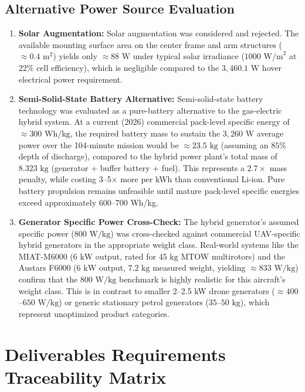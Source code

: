 \documentclass[11pt,a4paper]{article}
\begin{document}
\subsection{Alternative Power Source Evaluation}
\begin{enumerate}
    \item \textbf{Solar Augmentation:} Solar augmentation was considered and rejected. The available mounting surface area on the center frame and arm structures ($\approx 0.4\text{ m}^2$) yields only $\approx 88\text{ W}$ under typical solar irradiance ($1000\text{ W/m}^2$ at $22\%$ cell efficiency), which is negligible compared to the $3,460.1\text{ W}$ hover electrical power requirement.
    \item \textbf{Semi-Solid-State Battery Alternative:} Semi-solid-state battery technology was evaluated as a pure-battery alternative to the gas-electric hybrid system. At a current (2026) commercial pack-level specific energy of $\approx 300\text{ Wh/kg}$, the required battery mass to sustain the $3,260\text{ W}$ average power over the 104-minute mission would be $\approx 23.5\text{ kg}$ (assuming an $85\%$ depth of discharge), compared to the hybrid power plant's total mass of $8.323\text{ kg}$ (generator + buffer battery + fuel). This represents a $2.7\times$ mass penalty, while costing 3--5$\times$ more per kWh than conventional Li-ion. Pure battery propulsion remains unfeasible until mature pack-level specific energies exceed approximately 600--700 Wh/kg.
    \item \textbf{Generator Specific Power Cross-Check:} The hybrid generator's assumed specific power ($800\text{ W/kg}$) was cross-checked against commercial UAV-specific hybrid generators in the appropriate weight class. Real-world systems like the MIAT-M6000 ($6\text{ kW}$ output, rated for $45\text{ kg}$ MTOW multirotors) and the Austars F6000 ($6\text{ kW}$ output, $7.2\text{ kg}$ measured weight, yielding $\approx 833\text{ W/kg}$) confirm that the $800\text{ W/kg}$ benchmark is highly realistic for this aircraft's weight class. This is in contrast to smaller 2--2.5 kW drone generators ($\approx 400$--$650\text{ W/kg}$) or generic stationary petrol generators ($35$--$50\text{ kg}$), which represent unoptimized product categories.
\end{enumerate}

\section{Deliverables Requirements Traceability Matrix}
\end{document}
